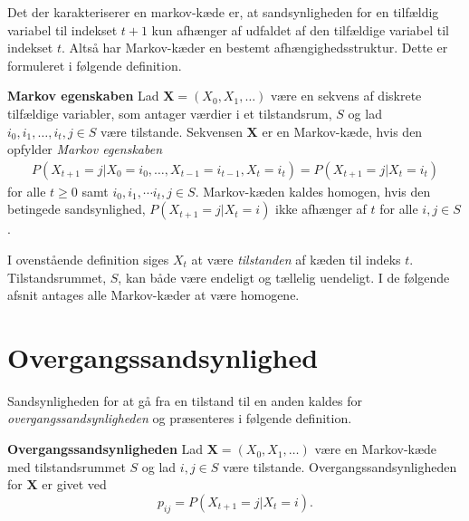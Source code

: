 
Det der karakteriserer en markov-kæde er, at sandsynligheden for en tilfældig variabel til indekset $t+1$ kun afhænger af udfaldet af den tilfældige variabel til indekset $t$. Altså har Markov-kæder en bestemt afhængighedsstruktur. Dette er formuleret i følgende definition.

\begin{minipage}\textwidth
\begin{defn}\textbf{Markov egenskaben} %
\newline
Lad $\bm{X}=(X_0, X_1, \dots)$ være en sekvens af diskrete tilfældige variabler, som antager værdier i et tilstandsrum, $S$ og lad $i_0, i_1, \ldots, i_{t}, j\in S$ være tilstande. 
Sekvensen $\bm{X}$ er en Markov-kæde, hvis den opfylder \textit{Markov egenskaben}
\begin{align}\label{eq:markov_egenskaben}
    P(X_{t+1} = j | X_0 = i_0, \dots, X_{t-1} = i_{t-1}, X_t = i_t) =  P(X_{t+1} = j | X_t = i_t)
\end{align}
for alle $t\geq 0$ samt $i_0, i_1, \cdots i_{t}, j\in S$.
Markov-kæden kaldes homogen, hvis den betingede sandsynlighed, $P(X_{t+1}=j|X_t=i)$ ikke afhænger af $t$ for alle $i,j\in S$.
\end{defn}
\end{minipage}

I ovenstående definition siges $X_t$ at være \textit{tilstanden} af kæden til indeks $t$. Tilstandsrummet, $S$, kan både være endeligt og tællelig uendeligt. I de følgende afsnit antages alle Markov-kæder at være homogene.


\section{Overgangssandsynlighed}
Sandsynligheden for at gå fra en tilstand til en anden  kaldes for \textit{overgangssandsynligheden} og præsenteres i følgende definition.

\begin{minipage}\textwidth
\begin{defn}\textbf{Overgangssandsynligheden} \label{def:overgangssandsynlighed} %
\newline
Lad $\bm X = (X_0, X_1, \ldots)$ være en Markov-kæde med tilstandsrummet $S$ og lad $i,j\in S$ være tilstande. Overgangssandsynligheden for $\bm X$ er givet ved $$p_{ij}=P(X_{t+1}=j|X_t=i).$$
\end{defn}
\end{minipage}

